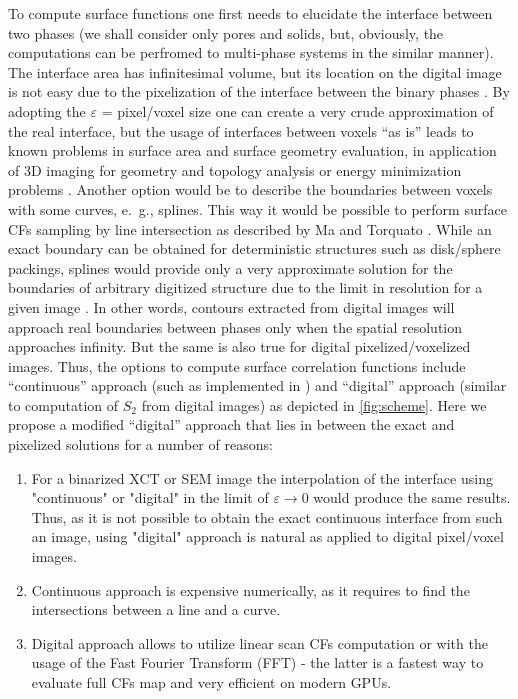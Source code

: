 \documentclass[reprint,amsmath,amssymb,aps,pre,showkeys,showpacs]{revtex4-1}
\begin{document}
To compute surface functions one first needs to elucidate the interface between
two phases (we shall consider only pores and solids, but, obviously, the
computations can be perfromed to multi-phase systems in the similar manner). The
interface area has infinitesimal volume, but its location on the digital image
is not easy due to the pixelization of the interface between the binary phases
\cite{ma2018SS}. By adopting the $\varepsilon$ = pixel/voxel size one can create
a very crude approximation of the real interface, but the usage of interfaces
between voxels ``as is'' leads to known problems in surface area and surface
geometry evaluation, in application of 3D imaging for geometry and topology
analysis \cite{AWR_PNM} or energy minimization problems
\cite{frank2018energy}. Another option would be to describe the boundaries
between voxels with some curves, e.~g., splines. This way it would be possible
to perform surface CFs sampling by line intersection as described by Ma and
Torquato \cite{ma2018SS}. While an exact boundary can be obtained for
deterministic structures such as disk/sphere packings, splines would provide
only a very approximate solution for the boundaries of arbitrary digitized
structure due to the limit in resolution for a given image
\cite{gerke2012tomographic}. In other words, contours extracted from digital
images will approach real boundaries between phases only when the spatial
resolution approaches infinity. But the same is also true for digital
pixelized/voxelized images. Thus, the options to compute surface correlation
functions include ``continuous'' approach (such as implemented in
\cite{ma2018SS}) and ``digital'' approach (similar to computation of $S_2$ from
digital images) as depicted in \cref{fig:scheme}. Here we propose a modified
``digital'' approach that lies in between the exact and pixelized solutions for
a number of reasons:
\begin{enumerate}
  \item For a binarized XCT or SEM image the interpolation of the interface
    using "continuous" or "digital" in the limit of $\varepsilon \to 0$ would
    produce the same results. Thus, as it is not possible to obtain the exact
    continuous interface from such an image, using "digital" approach is natural
    as applied to digital pixel/voxel images.
  \item Continuous approach is expensive numerically, as it requires to find the
    intersections between a line and a curve.
  \item Digital approach allows to utilize linear scan CFs computation or with
    the usage of the Fast Fourier Transform (FFT) - the latter is a fastest way
    to evaluate full CFs map and very efficient on modern GPUs.
\end{enumerate}
\end{document}
